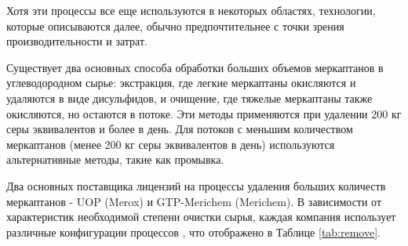 Хотя эти процессы все еще используются в некоторых областях, технологии, которые описываются далее, обычно предпочтительнее с точки зрения производительности и затрат.

Существует два основных способа обработки больших объемов меркаптанов в углеводородном сырье: экстракция, где легкие меркаптаны окисляются и удаляются в виде дисульфидов, и очищение, где тяжелые меркаптаны также окисляются, но остаются в потоке. Эти методы применяются при удалении \num{200} кг серы эквивалентов и более в день. Для потоков с меньшим количеством меркаптанов (менее \num{200} кг серы эквивалентов в день) используются альтернативные методы, такие как промывка.

Два основных поставщика лицензий на процессы удаления больших количеств меркаптанов - UOP (Merox\cite{farshi_kinetic_2005}) и GTP-Merichem (Merichem\cite{kohl_gas_1997}). В зависимости от характеристик необходимой степени очистки сырья, каждая компания использует различные конфигурации процессов \cite{bricker_advances_2012, noauthor_mericat_nodate, noauthor_thiolex_nodate}, что отображено в Таблице \cref{tab:remove}.


